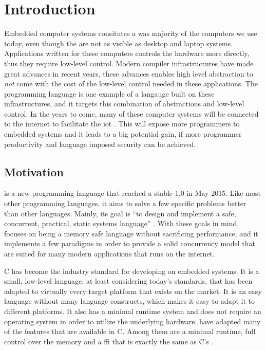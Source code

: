 
\chapter{Introduction}
\label{chap:intro}

Embedded computer systems consitutes a was majority of the computers we use today, even though the are not as visible as desktop and laptop systems.
Applications written for these computers controls the hardware more directly, thus they require low-level control.
Modern compiler infrastructures have made great advances in recent years, these advances enables high level abstraction to \emph{not} come with the cost of the low-level control needed in these applications.
The {\rust} programming language is one example of a langauge built on these infrastructures, and it targets this combination of abstractions and low-level control.
In the years to come, many of these computer systems will be connected to the internet to facilitate the \glsdesc{iot} \cite{Valhouli2010}.
This will expose more programmers to embedded systems and it leads to a big potential gain, if more programmer productivity and language imposed security can be achieved.

\section{Motivation} %
\label{sec:intro:rust_as_replacement_to_c}

{\rust} is a new programming language that reached a stable 1.0 in May 2015.
Like most other programming languages, it aims to solve a few specific problems better than other languages.
Mainly, its goal is ``to design and implement a safe, concurrent, practical, static systems language'' \cite{web:rust_faq}.
With these goals in mind, {\rust} focuses on being a memory safe language without sacrificing performance, and it implements a few paradigms in order to provide a solid concurrency model that are suited for many modern applications that runs on the internet.

C has become the industry standard for developing on embedded systems.
It is a small, low-level language, at least considering today's standards, that has been adapted to virtually every target platform that exists on the market.
It is an easy language without many language constructs, which makes it easy to adapt it to different platforms.
It also has a minimal runtime system and does not require an operating system in order to utilize the underlying hardware.
{\rust} have adapted many of the features that are available in C.
Among them are a minimal runtime, full control over the memory and a \gls{ffi} that is exactly the same as C's \cite{web:rust_once_run_everywhere}.

